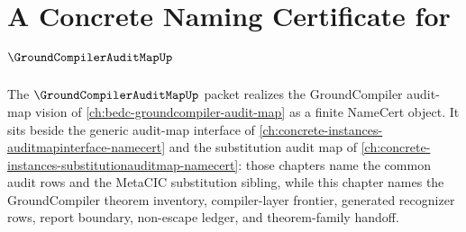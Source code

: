 \chapter{A Concrete Naming Certificate for $\GroundCompilerAuditMapUp$}
\label{ch:concrete-instances-groundcompilerauditmap-namecert}

The $\GroundCompilerAuditMapUp$ packet realizes the GroundCompiler audit-map vision of \autoref{ch:bedc-groundcompiler-audit-map} as a finite NameCert object. It sits beside the generic audit-map interface of \autoref{ch:concrete-instances-auditmapinterface-namecert} and the substitution audit map of \autoref{ch:concrete-instances-substitutionauditmap-namecert}: those chapters name the common audit rows and the MetaCIC substitution sibling, while this chapter names the GroundCompiler theorem inventory, compiler-layer frontier, generated recognizer rows, report boundary, non-escape ledger, and theorem-family handoff.



